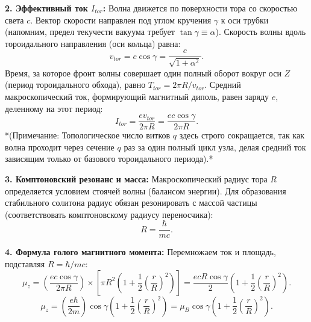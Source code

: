 \documentclass[11pt,a4paper]{article}
\begin{document}
\textbf{2. Эффективный ток $I_{tor}$:}
Волна движется по поверхности тора со скоростью света $c$. Вектор скорости направлен под углом кручения $\gamma$ к оси трубки (напомним, предел текучести вакуума требует $\tan \gamma \equiv \alpha$). 
Скорость волны вдоль тороидального направления (оси кольца) равна:
\begin{equation}
	v_{tor} = c \cos \gamma = \frac{c}{\sqrt{1 + \alpha^2}}.
\end{equation}
Время, за которое фронт волны совершает один полный оборот вокруг оси $Z$ (период тороидального обхода), равно $T_{tor} = 2\pi R / v_{tor}$. Средний макроскопический ток, формирующий магнитный диполь, равен заряду $e$, деленному на этот период:
\begin{equation}
	I_{tor} = \frac{e v_{tor}}{2\pi R} = \frac{e c \cos \gamma}{2\pi R}.
\end{equation}
*(Примечание: Топологическое число витков $q$ здесь строго сокращается, так как волна проходит через сечение $q$ раз за один полный цикл узла, делая средний ток зависящим только от базового тороидального периода).*

\textbf{3. Комптоновский резонанс и масса:}
Макроскопический радиус тора $R$ определяется условием стоячей волны (балансом энергии). Для образования стабильного солитона радиус обязан резонировать с массой частицы (соответствовать комптоновскому радиусу переносчика):
\begin{equation}
	R = \frac{\hbar}{mc}.
\end{equation}

\textbf{4. Формула голого магнитного момента:}
Перемножаем ток и площадь, подставляя $R = \hbar/mc$:
\begin{equation}
	\mu_z = \left( \frac{e c \cos \gamma}{2\pi R} \right) \times \left[ \pi R^2 \left( 1 + \frac{1}{2} \left(\frac{r}{R}\right)^2 \right) \right] = \frac{e c R \cos \gamma}{2} \left( 1 + \frac{1}{2} \left(\frac{r}{R}\right)^2 \right).
\end{equation}
\begin{equation}
	\mu_z = \left( \frac{e \hbar}{2m} \right) \cos \gamma \left( 1 + \frac{1}{2} \left(\frac{r}{R}\right)^2 \right) = \mu_B \cos \gamma \left( 1 + \frac{1}{2} \left(\frac{r}{R}\right)^2 \right).
\end{equation}
\end{document}
